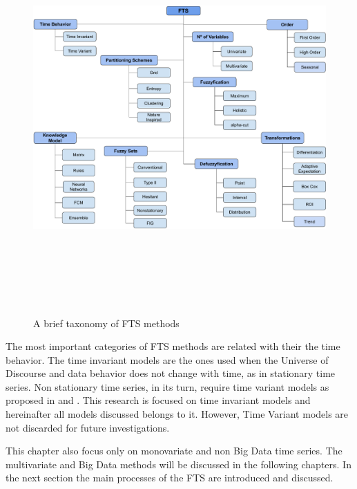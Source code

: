 \begin{figure}
    \centering
    \includegraphics[width=\textwidth, height=15cm]{figures/fts_taxonomy.pdf}
    \caption{A brief taxonomy of FTS methods}
    \label{fig:fts_taxonomy}
\end{figure}

The most important categories of FTS methods are related with their the time behavior. The time invariant models are the ones used when the Universe of Discourse and data behavior  does not change with time, as in stationary time series. Non stationary time series, in its turn, require time variant models as proposed in \cite{Song1994} and \cite{Wong2010}. This research is focused on time invariant models and hereinafter all models discussed belongs to it. However, Time Variant models are not discarded for future investigations.

This chapter also focus only on monovariate and non Big Data time series. The multivariate and Big Data methods will be discussed in the following chapters. In the next section the main processes of the FTS are introduced and discussed.


